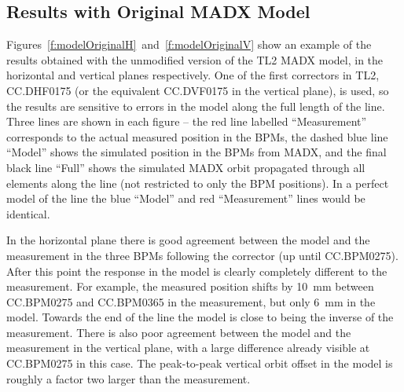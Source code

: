 \subsection{Results with Original MADX Model}
\label{ss:opticsResults}

Figures~\ref{f:modelOriginalH}~and~\ref{f:modelOriginalV} show an example of the results obtained with the unmodified version of the TL2 MADX model, in the horizontal and vertical planes respectively. One of the first correctors in TL2, CC.DHF0175 (or the equivalent CC.DVF0175 in the vertical plane), is used, so the results are sensitive to errors in the model along the full length of the line. Three lines are shown in each figure -- the red line labelled ``Measurement'' corresponds to the actual measured position in the BPMs, the dashed blue line ``Model'' shows the simulated position in the BPMs from MADX, and the final black line ``Full'' shows the simulated MADX orbit propagated through all elements along the line (not restricted to only the BPM positions). In a perfect model of the line the blue ``Model'' and red ``Measurement'' lines would be identical.

In the horizontal plane there is good agreement between the model and the measurement in the three BPMs following the corrector (up until CC.BPM0275). After this point the response in the model is clearly completely different to the measurement. For example, the measured position shifts by 10~mm between CC.BPM0275 and CC.BPM0365 in the measurement, but only 6~mm in the model. Towards the end of the line the model is close to being the inverse of the measurement. There is also poor agreement between the model and the measurement in the vertical plane, with a large difference already visible at CC.BPM0275 in this case. The peak-to-peak vertical orbit offset in the model is roughly a factor two larger than the measurement.

